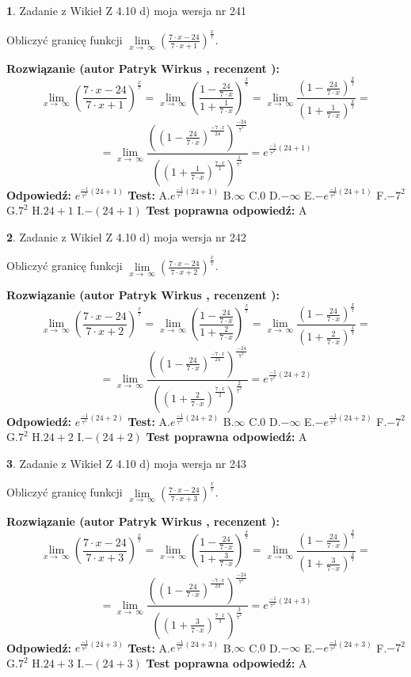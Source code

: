 \documentclass[12pt, a4paper]{article}
\theoremstyle{definition} %
\newtheorem{zad}{}
\newcommand{\zadStart}[1]{\begin{zad}#1\newline}
\newcommand{\zadStop}{\end{zad}}
\newcommand{\rozwStart}[2]{\noindent \textbf{Rozwiązanie (autor #1 , recenzent #2): }\newline}
\newcommand{\rozwStop}{\newline}
\newcommand{\odpStart}{\noindent \textbf{Odpowiedź:}\newline}
\newcommand{\odpStop}{\newline}
\newcommand{\testStart}{\noindent \textbf{Test:}\newline}
\newcommand{\testStop}{\newline}
\newcommand{\kluczStart}{\noindent \textbf{Test poprawna odpowiedź:}\newline}
\newcommand{\kluczStop}{\newline}
\begin{document}
\zadStart{Zadanie z Wikieł Z 4.10 d) moja wersja nr 241}


Obliczyć granicę funkcji  $\lim\limits_{x\to\ \infty}(\frac{7\cdot x-24}{7\cdot x+1})^{\frac{x}{7}}$.
\zadStop
\rozwStart{Patryk Wirkus}{}
$$\lim\limits_{x\to\ \infty}(\frac{7\cdot x-24}{7\cdot x+1})^{\frac{x}{7}} = \lim\limits_{x\to\ \infty}(\frac{1-\frac{24}{7\cdot x}}{1+\frac{1}{7\cdot x}})^{\frac{x}{7}}=\lim\limits_{x\to\ \infty}\frac{(1-\frac{24}{7\cdot x})^{\frac{x}{7}}}{(1+\frac{1}{7\cdot x})^{\frac{x}{7}}}=$$
$$=\lim\limits_{x\to\ \infty}\frac{((1-\frac{24}{7\cdot x})^{\frac{-7\cdot x}{24}})^{\frac{-24}{7^{2}}}}{((1+\frac{1}{7\cdot x})^{\frac{7\cdot x}{1}})^{\frac{1}{7^{2}}}}=e^{\frac{-1}{7^{2}}(24+1)}$$
\rozwStop
\odpStart
$e^{\frac{-1}{7^{2}}(24+1)}$
\odpStop
\testStart
A.$e^{\frac{-1}{7^{2}}(24+1)}$ B.$\infty$ C.$0$ D.$-\infty$ E.$-e^{\frac{-1}{7^{2}}(24+1)}$
F.$-7^{2}$ G.$7^{2}$
H.$24+1$
I.$-(24+1)$
\testStop
\kluczStart
A
\kluczStop



\zadStart{Zadanie z Wikieł Z 4.10 d) moja wersja nr 242}


Obliczyć granicę funkcji  $\lim\limits_{x\to\ \infty}(\frac{7\cdot x-24}{7\cdot x+2})^{\frac{x}{7}}$.
\zadStop
\rozwStart{Patryk Wirkus}{}
$$\lim\limits_{x\to\ \infty}(\frac{7\cdot x-24}{7\cdot x+2})^{\frac{x}{7}} = \lim\limits_{x\to\ \infty}(\frac{1-\frac{24}{7\cdot x}}{1+\frac{2}{7\cdot x}})^{\frac{x}{7}}=\lim\limits_{x\to\ \infty}\frac{(1-\frac{24}{7\cdot x})^{\frac{x}{7}}}{(1+\frac{2}{7\cdot x})^{\frac{x}{7}}}=$$
$$=\lim\limits_{x\to\ \infty}\frac{((1-\frac{24}{7\cdot x})^{\frac{-7\cdot x}{24}})^{\frac{-24}{7^{2}}}}{((1+\frac{2}{7\cdot x})^{\frac{7\cdot x}{2}})^{\frac{2}{7^{2}}}}=e^{\frac{-1}{7^{2}}(24+2)}$$
\rozwStop
\odpStart
$e^{\frac{-1}{7^{2}}(24+2)}$
\odpStop
\testStart
A.$e^{\frac{-1}{7^{2}}(24+2)}$ B.$\infty$ C.$0$ D.$-\infty$ E.$-e^{\frac{-1}{7^{2}}(24+2)}$
F.$-7^{2}$ G.$7^{2}$
H.$24+2$
I.$-(24+2)$
\testStop
\kluczStart
A
\kluczStop



\zadStart{Zadanie z Wikieł Z 4.10 d) moja wersja nr 243}


Obliczyć granicę funkcji  $\lim\limits_{x\to\ \infty}(\frac{7\cdot x-24}{7\cdot x+3})^{\frac{x}{7}}$.
\zadStop
\rozwStart{Patryk Wirkus}{}
$$\lim\limits_{x\to\ \infty}(\frac{7\cdot x-24}{7\cdot x+3})^{\frac{x}{7}} = \lim\limits_{x\to\ \infty}(\frac{1-\frac{24}{7\cdot x}}{1+\frac{3}{7\cdot x}})^{\frac{x}{7}}=\lim\limits_{x\to\ \infty}\frac{(1-\frac{24}{7\cdot x})^{\frac{x}{7}}}{(1+\frac{3}{7\cdot x})^{\frac{x}{7}}}=$$
$$=\lim\limits_{x\to\ \infty}\frac{((1-\frac{24}{7\cdot x})^{\frac{-7\cdot x}{24}})^{\frac{-24}{7^{2}}}}{((1+\frac{3}{7\cdot x})^{\frac{7\cdot x}{3}})^{\frac{3}{7^{2}}}}=e^{\frac{-1}{7^{2}}(24+3)}$$
\rozwStop
\odpStart
$e^{\frac{-1}{7^{2}}(24+3)}$
\odpStop
\testStart
A.$e^{\frac{-1}{7^{2}}(24+3)}$ B.$\infty$ C.$0$ D.$-\infty$ E.$-e^{\frac{-1}{7^{2}}(24+3)}$
F.$-7^{2}$ G.$7^{2}$
H.$24+3$
I.$-(24+3)$
\testStop
\kluczStart
A
\kluczStop
\end{document}
